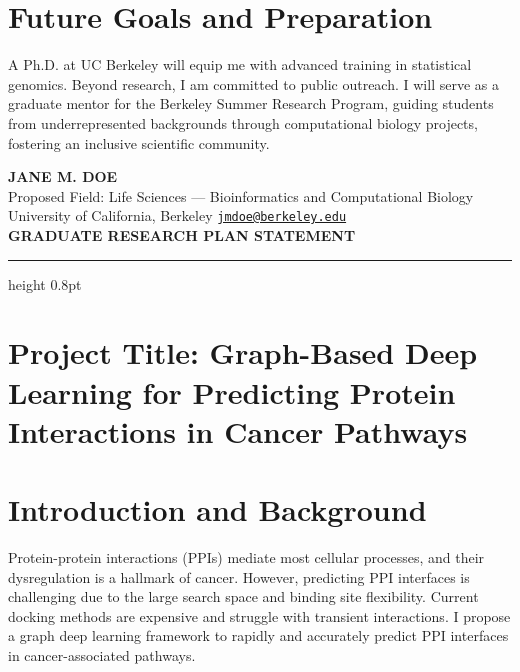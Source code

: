 \documentclass[11pt,letterpaper]{article}
\begin{document}
\section{Future Goals and Preparation}
A Ph.D. at UC Berkeley will equip me with advanced training in statistical genomics. Beyond research, I am committed to public outreach. I will serve as a graduate mentor for the Berkeley Summer Research Program, guiding students from underrepresented backgrounds through computational biology projects, fostering an inclusive scientific community.

\newpage


\begin{center}
    {\fontsize{12pt}{14pt}\selectfont \textbf{\textcolor{accent}{JANE M. DOE}}} \\
    \vspace{2pt}
    {\fontsize{9.5pt}{11pt}\selectfont Proposed Field: Life Sciences --- Bioinformatics and Computational Biology} \\
    {\fontsize{9.5pt}{11pt}\selectfont University of California, Berkeley \quad \textbullet \quad \href{mailto:jmdoe@berkeley.edu}{\texttt{jmdoe@berkeley.edu}}} \\
    \vspace{4pt}
    {\fontsize{10.5pt}{12pt}\selectfont \textbf{GRADUATE RESEARCH PLAN STATEMENT}}
\end{center}
\vspace{-8pt}
\textcolor{accent}{\hrule height 0.8pt}
\vspace{6pt}

\section{Project Title: Graph-Based Deep Learning for Predicting Protein Interactions in Cancer Pathways}

\section{Introduction and Background}
Protein-protein interactions (PPIs) mediate most cellular processes, and their dysregulation is a hallmark of cancer. However, predicting PPI interfaces is challenging due to the large search space and binding site flexibility. Current docking methods are expensive and struggle with transient interactions. I propose a graph deep learning framework to rapidly and accurately predict PPI interfaces in cancer-associated pathways.
\end{document}

